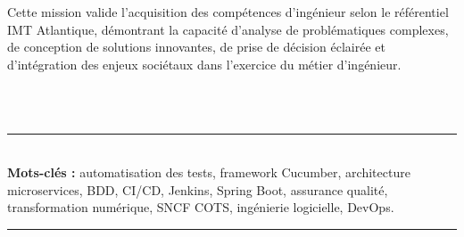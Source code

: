 Cette mission valide l'acquisition des compétences d'ingénieur selon le référentiel IMT Atlantique, démontrant la capacité d'analyse de problématiques complexes, de conception de solutions innovantes, de prise de décision éclairée et d'intégration des enjeux sociétaux dans l'exercice du métier d'ingénieur.

\\[0.3cm]
\\
\rule{\linewidth}{0.2mm} \\[0.2cm]
\textbf {Mots-clés :} automatisation des tests, framework Cucumber, architecture microservices, BDD, CI/CD, Jenkins, Spring Boot, assurance qualité, transformation numérique, SNCF COTS, ingénierie logicielle, DevOps. \\
\rule{\linewidth}{0.2mm}